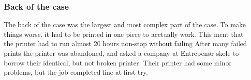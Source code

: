 \subsubsection*{Back of the case}
The back of the case was the largest and most complex part of the case.
To make things worse, it had to be printed in one piece to acctually work.
This ment that the printer had to run almost 20 hours non-stop without failing
After many failed prints the printer was abandoned, and asked a company at Entrepenør skole to borrow their identical, but not broken printer.
Their printer had some minor problems, but the job completed fine at first try.

